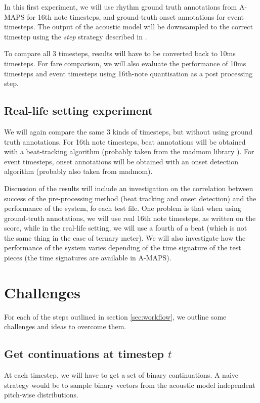 \documentclass{article}
\begin{document}
In this first experiment, we will use rhythm ground truth annotations from A-MAPS for 16th note timesteps, and ground-truth onset annotations for event timesteps.
The output of the acoustic model will be downsampled to the correct timestep using the \emph{step}
strategy described in \cite{ycart2018polyphonic}.

To compare all 3 timesteps, results will have to be converted back to 10ms timesteps.
For fare comparison, we will also evaluate the performance of 10ms timesteps and event timesteps using 16th-note quantisation as a post processing step.

\subsection{Real-life setting experiment}

We will again compare the same 3 kinds of timesteps, but without using ground truth annotations.
For 16th note timesteps, beat annotations will be obtained with a beat-tracking algorithm (probably taken from the madmom library \cite{madmom}).
For event timesteps, onset annotations will be obtained with an onset detection algorithm (probably also taken from madmom).

Discussion of the results will include an investigation on the correlation between success of the pre-processing method (beat tracking and onset detection) and the performance of the system, fo each test file.
One problem is that when using ground-truth annotations, we will use real 16th note timesteps, as written on the score, while in the real-life setting, we will use a fourth of a beat (which is not the same thing in the case of ternary meter).
We will also investigate how the performance of the system varies depending of the time signature of the test pieces (the time signatures are available in A-MAPS).


\section{Challenges}

For each of the steps outlined in section \ref{sec:workflow}, we outline some challenges and ideas to overcome them.

\subsection{Get continuations at timestep $t$}

At each timestep, we will have to get a set of binary continuations.
A naive strategy would be to sample binary vectors from the acoustic model independent pitch-wise distributions.
\end{document}
